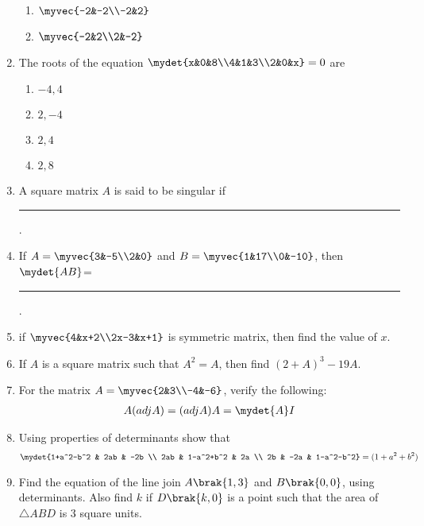 \begin{enumerate}
\begin{enumerate}
		\item $\myvec{-2&-2\\-2&2}$
		\item $\myvec{-2&2\\2&-2}$
	\end{enumerate}
\item The roots of the equation $\mydet{x&0&8\\4&1&3\\2&0&x}=0$ are
	\begin{enumerate}
		\item $-4,4$
		\item $2,-4$
		\item $2,4$
		\item $2,8$
	\end{enumerate}
\item A square matrix $A$ is said to be singular if \rule{2cm}{0.15mm}.
\item If $A= \myvec{3&-5\\2&0}$ and $B=\myvec{1&17\\0&-10}$, then $\mydet{AB}$= \rule{2cm}{0.15mm}.
\item if $\myvec{4&x+2\\2x-3&x+1}$ is symmetric matrix, then find the value of $x$.
\item If $A$ is a square matrix such that $A^2=A$, then find $(2+A)^3 -19A$.
\item For the matrix $A=\myvec{2&3\\-4&-6}$, verify the following:
	\begin{align}
		A(adj A) = (adj A)A= \mydet{A}I
	\end{align}
\item Using properties of determinants show that
	\begin{align}
		\mydet{1+a^2-b^2 & 2ab & -2b \\ 2ab & 1-a^2+b^2 & 2a \\ 2b & -2a & 1-a^2-b^2} = (1+a^2+b^2)
	\end{align}
\item Find the equation of the line join $A\brak{1, 3}$ and $B\brak{0, 0}$, using determinants. Also find $k$ if $D\brak{k,0}$ is a point such that the area of $\triangle ABD$ is $3$ square units.


\end{enumerate}
